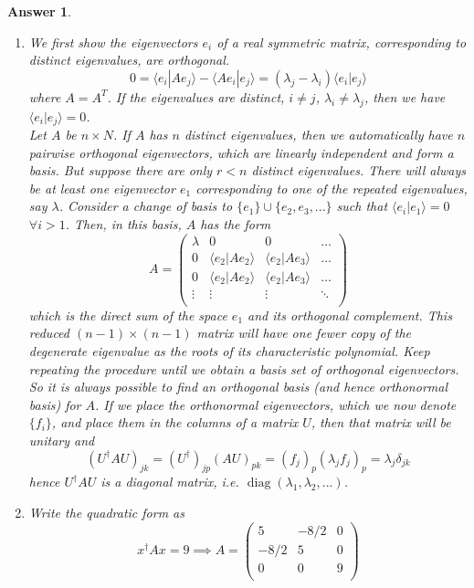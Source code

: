 \documentclass[a4paper]{article}
\DeclareMathOperator{\diag}{diag}
\newtheorem{ans}{Answer}[section]
\theoremstyle{new}
\begin{document}
\begin{ans}\leavevmode
\begin{enumerate}[label=(\alph*)]
\item We first show the eigenvectors $e_i$ of a real symmetric matrix, corresponding to distinct eigenvalues, are orthogonal.
$$0=\langle e_i|Ae_j\rangle-\langle Ae_i|e_j\rangle=(\lambda_j-\lambda_i)\langle e_i|e_j\rangle$$
where $A=A^T$. If the eigenvalues are distinct, $i\neq j$, $\lambda_i\neq\lambda_j$, then we have $\langle e_i|e_j\rangle=0$.\\[5pt]
Let $A$ be $n\times N$. If $A$ has $n$ distinct eigenvalues, then we automatically have $n$ pairwise orthogonal eigenvectors, which are linearly independent and form a basis. But suppose there are only $r<n$ distinct eigenvalues. There will always be at least one eigenvector $e_1$ corresponding to one of the repeated eigenvalues, say $\lambda$. Consider a change of basis to $\{e_1\}\cup\{e_2,e_3,...\}$ such that $\langle e_i|e_1\rangle=0$ $\forall i>1$. Then, in this basis, $A$ has the form
$$A=\begin{pmatrix}\lambda&0&0&\dots\\0&\langle e_2|Ae_2\rangle&\langle e_2|Ae_3\rangle&\dots\\0&\langle e_2|Ae_2\rangle&\langle e_2|Ae_3\rangle&\dots\\\vdots&\vdots&\vdots&\ddots\\\end{pmatrix}$$
which is the direct sum of the space $e_1$ and its orthogonal complement. This reduced $(n-1)\times(n-1)$ matrix will have one fewer copy of the degenerate eigenvalue as the roots of its characteristic polynomial. Keep repeating the procedure until we obtain a basis set of orthogonal eigenvectors.\\[5pt]
So it is always possible to find an orthogonal basis (and hence orthonormal basis) for $A$. If we place the orthonormal eigenvectors, which we now denote $\{f_i\}$, and place them in the columns of a matrix $U$, then that matrix will be unitary and
$$(U^\dag AU)_{jk}=(U^\dag)_{jp}(AU)_{pk}=(f_j)_p(\lambda_jf_j)_p=\lambda_j\delta_{jk}$$
hence $U^\dag AU$ is a diagonal matrix, i.e. $\diag(\lambda_1,\lambda_2,...)$.
\item Write the quadratic form as 
$$x^\dag Ax=9\implies A=\begin{pmatrix}5&-8/2&0\\-8/2&5&0\\0&0&9\\\end{pmatrix}$$

\end{enumerate}
\end{ans}
\end{document}
